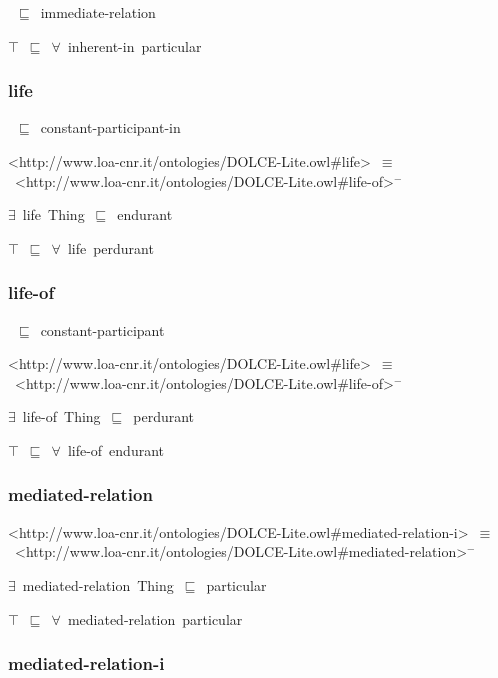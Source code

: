 \documentclass{article}
\begin{document}
~\ensuremath{\sqsubseteq}~immediate-relation

\ensuremath{\top}~\ensuremath{\sqsubseteq}~\ensuremath{\forall}~inherent-in~particular

\subsubsection*{life}

~\ensuremath{\sqsubseteq}~constant-participant-in

<http://www.loa-cnr.it/ontologies/DOLCE-Lite.owl#life>~\ensuremath{\equiv}~<http://www.loa-cnr.it/ontologies/DOLCE-Lite.owl#life-of>\ensuremath{^-}

\ensuremath{\exists}~life~Thing~\ensuremath{\sqsubseteq}~endurant

\ensuremath{\top}~\ensuremath{\sqsubseteq}~\ensuremath{\forall}~life~perdurant

\subsubsection*{life-of}

~\ensuremath{\sqsubseteq}~constant-participant

<http://www.loa-cnr.it/ontologies/DOLCE-Lite.owl#life>~\ensuremath{\equiv}~<http://www.loa-cnr.it/ontologies/DOLCE-Lite.owl#life-of>\ensuremath{^-}

\ensuremath{\exists}~life-of~Thing~\ensuremath{\sqsubseteq}~perdurant

\ensuremath{\top}~\ensuremath{\sqsubseteq}~\ensuremath{\forall}~life-of~endurant

\subsubsection*{mediated-relation}

<http://www.loa-cnr.it/ontologies/DOLCE-Lite.owl#mediated-relation-i>~\ensuremath{\equiv}~<http://www.loa-cnr.it/ontologies/DOLCE-Lite.owl#mediated-relation>\ensuremath{^-}

\ensuremath{\exists}~mediated-relation~Thing~\ensuremath{\sqsubseteq}~particular

\ensuremath{\top}~\ensuremath{\sqsubseteq}~\ensuremath{\forall}~mediated-relation~particular

\subsubsection*{mediated-relation-i}
\end{document}
